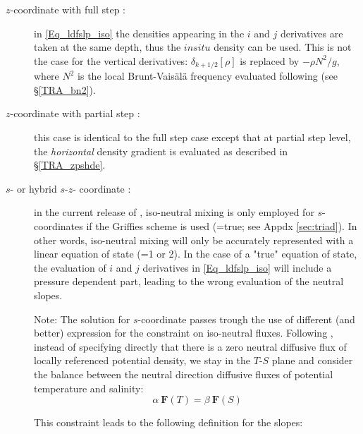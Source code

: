 {\begin{description}
\item[$z$-coordinate with full step : ] in \eqref{Eq_ldfslp_iso} the densities 
appearing in the $i$ and $j$ derivatives  are taken at the same depth, thus 
the $in situ$ density can be used. This is not the case for the vertical 
derivatives: $\delta_{k+1/2}[\rho]$ is replaced by $-\rho N^2/g$, where $N^2$ 
is the local Brunt-Vais\"{a}l\"{a} frequency evaluated following 
\citet{McDougall1987} (see \S\ref{TRA_bn2}). 

\item[$z$-coordinate with partial step : ] this case is identical to the full step 
case except that at partial step level, the \emph{horizontal} density gradient 
is evaluated as described in \S\ref{TRA_zpshde}.

\item[$s$- or hybrid $s$-$z$- coordinate : ] in the current release of \NEMO, 
iso-neutral mixing is only employed for $s$-coordinates if the
Griffies scheme is used (=true; see Appdx \ref{sec:triad}). 
In other words, iso-neutral mixing will only be accurately represented with a 
linear equation of state (=1 or 2). In the case of a "true" equation 
of state, the evaluation of $i$ and $j$ derivatives in \eqref{Eq_ldfslp_iso} 
will include a pressure dependent part, leading to the wrong evaluation of 
the neutral slopes.

Note: The solution for $s$-coordinate passes trough the use of different 
(and better) expression for the constraint on iso-neutral fluxes. Following 
\citet{Griffies_Bk04}, instead of specifying directly that there is a zero neutral 
diffusive flux of locally referenced potential density, we stay in the $T$-$S$ 
plane and consider the balance between the neutral direction diffusive fluxes 
of potential temperature and salinity:
\begin{equation}
\alpha \ \textbf{F}(T) = \beta \ \textbf{F}(S)
\end{equation}

This constraint leads to the following definition for the slopes:


\end{description}}
